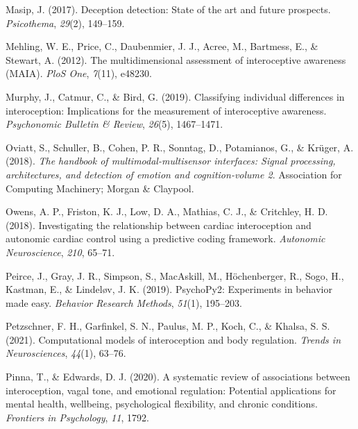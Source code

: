 \documentclass[
  man,floatsintext]{apa6}
\newlength{\cslhangindent}
\newlength{\cslentryspacingunit} %
\newenvironment{CSLReferences}[2] %
 {%
  \setlength{\parindent}{0pt}
  \ifodd #1
  \let\oldpar\par
  \def\par{\hangindent=\cslhangindent\oldpar}
  \fi
  \setlength{\parskip}{#2\cslentryspacingunit}
 }%
 {}
\begin{document}
\begin{CSLReferences}{1}{0}
\leavevmode{}%
Masip, J. (2017). Deception detection: State of the art and future prospects. \emph{Psicothema}, \emph{29}(2), 149--159.

\leavevmode{}%
Mehling, W. E., Price, C., Daubenmier, J. J., Acree, M., Bartmess, E., \& Stewart, A. (2012). The multidimensional assessment of interoceptive awareness (MAIA). \emph{PloS One}, \emph{7}(11), e48230.

\leavevmode{}%
Murphy, J., Catmur, C., \& Bird, G. (2019). Classifying individual differences in interoception: Implications for the measurement of interoceptive awareness. \emph{Psychonomic Bulletin \& Review}, \emph{26}(5), 1467--1471.

\leavevmode{}%
Oviatt, S., Schuller, B., Cohen, P. R., Sonntag, D., Potamianos, G., \& Krüger, A. (2018). \emph{The handbook of multimodal-multisensor interfaces: Signal processing, architectures, and detection of emotion and cognition-volume 2}. Association for Computing Machinery; Morgan \& Claypool.

\leavevmode{}%
Owens, A. P., Friston, K. J., Low, D. A., Mathias, C. J., \& Critchley, H. D. (2018). Investigating the relationship between cardiac interoception and autonomic cardiac control using a predictive coding framework. \emph{Autonomic Neuroscience}, \emph{210}, 65--71.

\leavevmode{}%
Peirce, J., Gray, J. R., Simpson, S., MacAskill, M., Höchenberger, R., Sogo, H., Kastman, E., \& Lindeløv, J. K. (2019). PsychoPy2: Experiments in behavior made easy. \emph{Behavior Research Methods}, \emph{51}(1), 195--203.

\leavevmode{}%
Petzschner, F. H., Garfinkel, S. N., Paulus, M. P., Koch, C., \& Khalsa, S. S. (2021). Computational models of interoception and body regulation. \emph{Trends in Neurosciences}, \emph{44}(1), 63--76.

\leavevmode{}%
Pinna, T., \& Edwards, D. J. (2020). A systematic review of associations between interoception, vagal tone, and emotional regulation: Potential applications for mental health, wellbeing, psychological flexibility, and chronic conditions. \emph{Frontiers in Psychology}, \emph{11}, 1792.


\end{CSLReferences}
\end{document}
